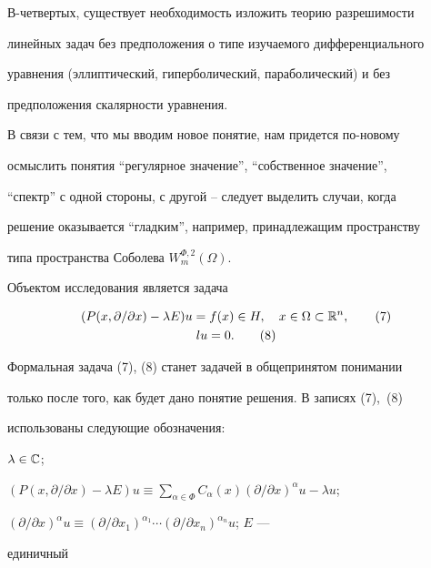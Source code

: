  


В-четвертых, существует необходимость изложить теорию разрешимости 


линейных задач без предположения о типе изучаемого дифференциального 


уравнения (эллиптический, гиперболический, параболический) и без 


предположения скалярности уравнения. 


 


В связи с тем, что мы вводим новое понятие, нам придется по-новому 


осмыслить понятия ``регулярное значение'', ``собственное значение'', 


``спектр'' с одной стороны, с другой -- следует выделить случаи, когда 


решение оказывается ``гладким'', например, принадлежащим пространству 


типа пространства Соболева $W^{\Phi,2}_m(\Omega)$. 


 


Объектом исследования является задача 


\begin{gather} 


(P(x,\partial/\partial x)-\lambda E)u=f(x)\in H,\quad 


x\in\Omega\subset\Bbb R^n,\tag{7} \\ 


l u=0. \tag{8}


\end{gather} 


Формальная задача (7), (8) станет задачей в общепринятом понимании 


только после того, как будет дано понятие решения. В записях (7),~(8) 


использованы следующие обозначения: 


$\lambda\in\Bbb C$; 


$(P(x,\partial/\partial x)-\lambda E)u\equiv 


\sum\limits_{\alpha\in\Phi}C_\alpha(x) 


(\partial/\partial x)^\alpha u-\lambda u$; 


$(\partial/\partial x)^\alpha u\equiv 


(\partial/\partial x_1)^{\alpha_1}\dotsb 


(\partial/\partial x_n)^{\alpha_n}u$; $E$ --- 


единичный 



